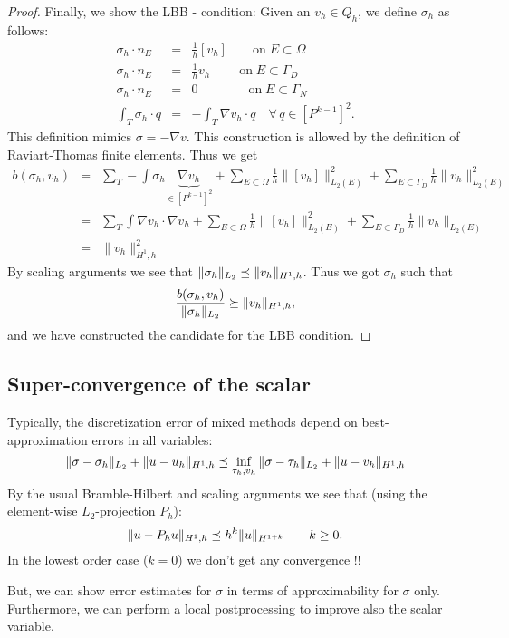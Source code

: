 \begin{proof}
Finally, we show the LBB - condition: Given an $v_h \in Q_h$, we define $\sigma_h$ as follows:
\begin{eqnarray*}
\sigma_h \cdot n_E & =  & \tfrac{1}{h} [v_h] \qquad \text{on} \; E \subset \Omega \\
\sigma_h \cdot n_E & =  & \tfrac{1}{h} v_h \; \qquad \text{on} \; E \subset \Gamma_D \\
\sigma_h \cdot n_E & =  & 0 \qquad \qquad \text{on} \; E \subset \Gamma_N \\
\int_T \sigma_h \cdot q & = & -\int_T \nabla v_h \cdot q \quad \forall \, q \in [P^{k-1}]^2. 
\end{eqnarray*}
This definition mimics $\sigma = -\nabla v$. This construction is allowed by the definition of Raviart-Thomas finite elements.
Thus we get
\begin{eqnarray*}
b(\sigma_h, v_h) & = & \sum_T -\int \sigma_h \underbrace{\nabla
                       v_h}_{\in [P^{k-1}]^2} + \sum_{E \subset \Omega} \tfrac{1}{h} \| [v_h] \|_{L_2(E)}^2 + \sum_{E \subset \Gamma_D} \tfrac{1}{h} \| v_h \|_{L_2(E)}^2 \\
& = & \sum_T \int \nabla v_h \cdot  \nabla v_h + \sum_{E \subset \Omega} \tfrac{1}{h} \| [v_h] \|_{L_2(E)}^2 + \sum_{E \subset \Gamma_D} \tfrac{1}{h} \| v_h \|_{L_2(E)} \\
& = & \| v_h \|_{H^1,h}^2
\end{eqnarray*}
By scaling arguments we see that $\| \sigma_h \|_{L_2} \preceq \| v_h \|_{H^1,h}$. Thus we got $\sigma_h$ such that
$$
\frac{b(\sigma_h, v_h)} {\| \sigma_h \|_{L_2}} \succeq \| v_h \|_{H^1,h},
$$
and we have constructed the candidate for the LBB condition.
\end{proof}


\subsection{Super-convergence of the scalar}

Typically, the discretization error of mixed methods depend on best-approximation errors in all variables:
$$
\| \sigma - \sigma_h \|_{L_2} + \| u - u_h \|_{H^1,h} \preceq \inf_{\tau_h, v_h} \| \sigma - \tau_h \|_{L_2} + \| u - v_h \|_{H^1,h}
$$
By the usual Bramble-Hilbert and scaling arguments we see that (using the element-wise $L_2$-projection $P_h$):
$$
\| u - P_h u \|_{H^1,h} \preceq h^{k} \| u \|_{H^{1+k}} \qquad k \geq 0.
$$
In the lowest order case ($k = 0$) we don't get any convergence !!

But, we can show error estimates for $\sigma$ in terms of approximability for $\sigma$ only. Furthermore, we can perform a local postprocessing to
improve also the scalar variable.

